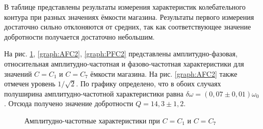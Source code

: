 \documentclass[a4paper,12pt]{article} %
\begin{document}
В таблице представлены результаты измерения характеристик колебательного контура при разных значениях ёмкости магазина. Результаты первого измерения достаточно сильно отклоняются от средних, так как соответствующее значение добротности получается достаточно небольшим. 

На рис. \ref{graph:AFC1}, \ref{graph:AFC2}, \ref{graph:PFC2} представлены амплитудно-фазовая, относительная амплитудно-частотная и фазово-частотная характеристики для значений $C = C_1$ и $C = C_7$ ёмкости магазина. На рис. \ref{graph:AFC2} также отмечен уровень $1/\sqrt{2}$. По графику определено, что в обоих случаях полуширина амплитудно-частотной характеристики равна $\delta\omega =( 0,07\pm0,01)\omega_0 $. Отсюда получено значение добротности $Q = 14,3\pm1,2$.
 
\begin{figure}[h] \label{graph:AFC1}
\begin{center}
\caption{Амплитудно-частотные характеристики при $C = C_1$ и $C = C_7$}
\end{center}
\end{figure}
\end{document}
